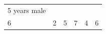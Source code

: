 \begin{enumerate}[noitemsep, label=\textbf{\arabic*}. ]
{\begin{tabular}[t]{|l|l|l|l|l|l|}
    
        5 years male%
     \tabularnewline\cline{1-1}\cline{2-2}\cline{3-3}\cline{4-4}\cline{5-5}\cline{6-6}
    
    
        6 &
    
    
        2 &
    
    
        5 &
    
    
        7 &
    
    
        4 &
    
    
        6%
     \tabularnewline\cline{1-1}\cline{2-2}\cline{3-3}\cline{4-4}\cline{5-5}\cline{6-6}
    \end{tabular}} %
\end{enumerate}
